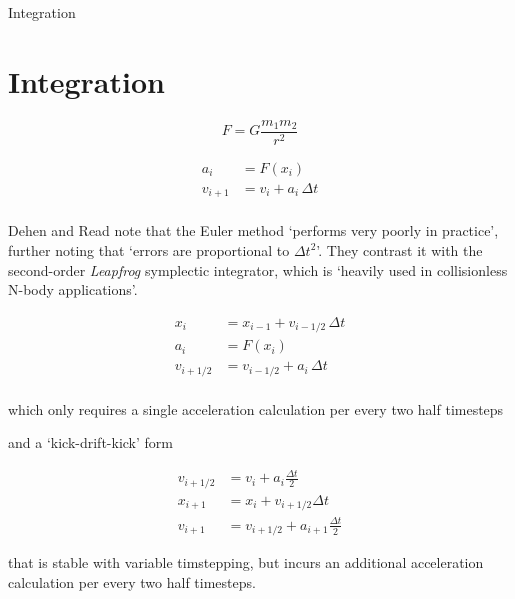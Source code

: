 \documentclass{beamer}
\begin{document}
\begin{frame}[allowframebreaks]{Integration}
\section{Integration}

\[
  F = G \frac{m_1 m_2}{r^2}
\]

\begin{align*}
a_{i}&=F(x_{i})\\
v_{i+1}&=v_{i}+a_{i}\,\Delta t\\
\end{align*}

\framebreak

Dehen and Read note that the Euler method `performs very poorly in practice', further noting that `errors are proportional to $\Delta t^2$'. They contrast it with the second-order \textit{Leapfrog} symplectic integrator, which is `heavily used in collisionless N-body applications'.

\begin{align*}
x_{i}&=x_{i-1}+v_{i-1/2}\,\Delta t\\
a_{i}&=F(x_{i})\\
v_{i+1/2}&=v_{i-1/2}+a_{i}\,\Delta t\\
\end{align*}

which only requires a single acceleration calculation per every two half timesteps

\framebreak

and a `kick-drift-kick' form

\begin{align*}
v_{i+1/2}&=v_{i}+a_{i}{\frac {\Delta t}{2}}\\
x_{i+1}&=x_{i}+v_{i+1/2}\Delta t\\
v_{i+1}&=v_{i+1/2}+a_{i+1}{\frac {\Delta t}{2}}
\end{align*}

that is stable with variable timstepping, but incurs an additional acceleration calculation per every two half timesteps.
\end{frame}
\end{document}
